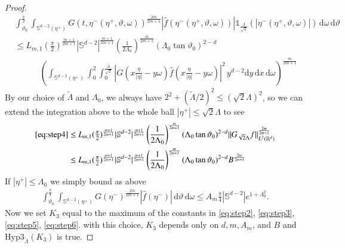 \documentclass[11pt,a4paper,reqno]{amsart}
\theoremstyle{plain}
\theoremstyle{definition}
\begin{document}
\begin{proof}
 \begin{align}
 	&\int_{\vartheta_0}^{\frac{\pi}{2}} \int_{{\mathbb{S}}^{d-2}(\eta^+)} G\left(t,\eta^-(\eta^+,\vartheta,\omega)\right)^{\frac{2m}{2m+1}} \left|\hat{f}\left(\eta^-(\eta^+,\vartheta,\omega)\right)\right|{\mathds{1}}_{\tfrac{\Lambda}{\sqrt{2}}}(|\eta^-(\eta^+,\vartheta,\omega)|)\,\mathrm{d}\omega\,\mathrm{d}\vartheta \nonumber\\
	&\le
	 L_{m,1} (\tfrac{\pi}{2})^{\frac{m+1}{2m+1}} |{\mathbb{S}}^{d-2}|^{\frac{m+1}{2m+1}}
		\left(\frac{1}{2\Lambda_0} \right)^{\frac{m}{2m+1}} (\Lambda_0\tan\vartheta_0)^{2-d}
		\nonumber\\
		 &\qquad\quad
		\left( \int_{{\mathbb{S}}^{d-2}(\eta^+)} \int_{0}^{2}
		\int_{0}^{\frac{\widetilde{\Lambda}}{\sqrt{2}}}
			| G(x\tfrac{\eta}{|\eta|}-y\omega)\hat{f}(x\tfrac{\eta}{|\eta|}-y\omega)|^2
			\, y^{d-2}\mathrm{d}y\, \mathrm{d}x\, \mathrm{d}\omega \right)^{\frac{m}{2m+1}}	
			\label{eq:step4}	
 \end{align}
 By our choice of $\widetilde{\Lambda}$ and $\Lambda_0$, we always have $2^2+ (\widetilde{\Lambda}/2)^2\le (\sqrt{2}\Lambda)^2$, so we can extend the integration above to the whole ball $|\eta^+|\le \sqrt{2}\Lambda$ to see
  \begin{align}
  		\eqref{eq:step4}
  		&	\le
		L_{m,1} (\tfrac{\pi}{2})^{\frac{m+1}{2m+1}} |{\mathbb{S}}^{d-2}|^{\frac{m+1}{2m+1}}
		\left(\frac{1}{2\Lambda_0} \right)^{\frac{m}{2m+1}} (\Lambda_0\tan\vartheta_0)^{2-d}
		\| G_{\sqrt{2}\Lambda}f \|_{L^2({\mathbb{R}}^d)}^{\frac{2m}{2m+1}} \nonumber\\
		&	\le
		L_{m,1} (\tfrac{\pi}{2})^{\frac{m+1}{2m+1}} |{\mathbb{S}}^{d-2}|^{\frac{m+1}{2m+1}}
		\left(\frac{1}{2\Lambda_0} \right)^{\frac{m}{2m+1}} (\Lambda_0\tan\vartheta_0)^{2-d}
		B^{\frac{2m}{2m+1}}
		\label{eq:step5}
  \end{align}
  If $|\eta^+|\le \Lambda_0$ we simply bound as above
 \begin{align}\label{eq:step6}
 	\int_{\vartheta_0}^{\tfrac{\pi}{4}} \int_{{\mathbb{S}}^{d-2}(\eta^+)}  G(\eta^-)^{\frac{2m}{2m+1}} |\hat{f}(\eta^-)| \, \mathrm{d}\vartheta\, \mathrm{d}\omega
  	\le A_m \frac{\pi}{4}|{\mathbb{S}}^{d-2}| e^{1+\Lambda_0^2}.
 \end{align}
 Now we set $K_3$ equal to the maximum of the constants in \eqref{eq:step2}, \eqref{eq:step3}, \eqref{eq:step5}, \eqref{eq:step6}. with this choice, $K_3$ depends only on $d,m,A_m$, and $B$ and   $\mathrm{Hyp3}_{\widetilde{\Lambda}}(K_3)$ is true.
\end{proof}
\end{document}
